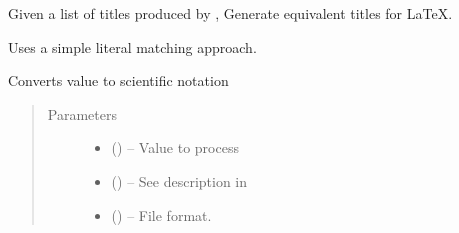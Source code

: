 \documentclass[letterpaper,10pt,english]{sphinxmanual}
\begin{document}

\begin{fulllineitems}
\label{\detokenize{references/write:nmrespy.write._map_to_latex_titles}}
\sphinxAtStartPar
Given a list of titles produced by {\hyperref[\detokenize{references/write:nmrespy.write._construct_paramtable}]{}},
Generate equivalent titles for LaTeX.

\sphinxAtStartPar
Uses a simple literal matching approach.

\end{fulllineitems}


\begin{fulllineitems}
\label{\detokenize{references/write:nmrespy.write._scientific_notation}}
\sphinxAtStartPar
Converts value to scientific notation
\begin{quote}\begin{description}
\item[{Parameters}] \leavevmode\begin{itemize}
\item {} 
\sphinxAtStartPar
{} () – Value to process

\item {} 
\sphinxAtStartPar
{} (\sphinxstyleliteralemphasis{\sphinxupquote{(}}\sphinxstyleliteralemphasis{\sphinxupquote{, }}\sphinxstyleliteralemphasis{\sphinxupquote{)}}) – See description in {\hyperref[\detokenize{references/write:nmrespy.write.write_result}]{}}

\item {} 
\sphinxAtStartPar
{} (\sphinxstyleliteralemphasis{\sphinxupquote{, }}) – File format.

\end{itemize}

\end{description}\end{quote}

\end{fulllineitems}
\end{document}
